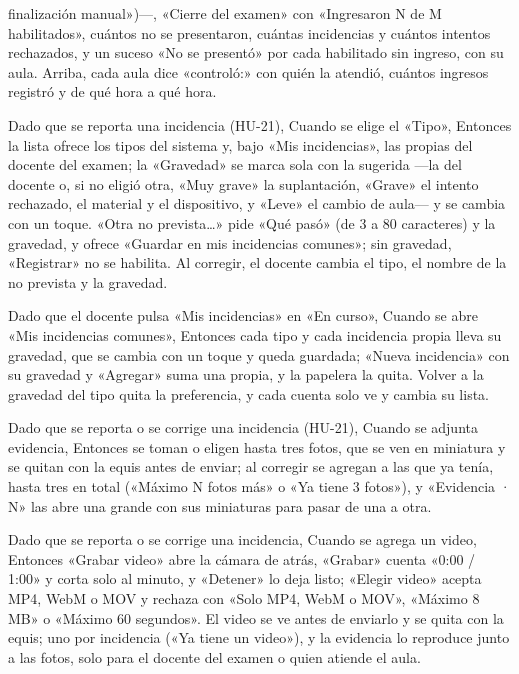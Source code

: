 {      finalización manual»)---, «Cierre del examen» con «Ingresaron N de M habilitados»,
      cuántos no se presentaron, cuántas incidencias y cuántos intentos rechazados, y un
      suceso «No se presentó» por cada habilitado sin ingreso, con su aula. Arriba, cada
      aula dice «controló:» con quién la atendió, cuántos ingresos registró y de qué
      hora a qué hora.
\item Dado que se reporta una incidencia (HU-21), Cuando se elige el «Tipo», Entonces
      la lista ofrece los tipos del sistema y, bajo «Mis incidencias», las propias del
      docente del examen; la «Gravedad» se marca sola con la sugerida ---la del docente
      o, si no eligió otra, «Muy grave» la suplantación, «Grave» el intento rechazado,
      el material y el dispositivo, y «Leve» el cambio de aula--- y se cambia con un
      toque. «Otra no prevista…» pide «Qué pasó» (de 3 a 80 caracteres) y la gravedad, y
      ofrece «Guardar en mis incidencias comunes»; sin gravedad, «Registrar» no se
      habilita. Al corregir, el docente cambia el tipo, el nombre de la no prevista y la
      gravedad.
\item Dado que el docente pulsa «Mis incidencias» en «En curso», Cuando se abre «Mis
      incidencias comunes», Entonces cada tipo y cada incidencia propia lleva su
      gravedad, que se cambia con un toque y queda guardada; «Nueva incidencia» con su
      gravedad y «Agregar» suma una propia, y la papelera la quita. Volver a la gravedad
      del tipo quita la preferencia, y cada cuenta solo ve y cambia su lista.
\item Dado que se reporta o se corrige una incidencia (HU-21), Cuando se adjunta
      evidencia, Entonces se toman o eligen hasta tres fotos, que se ven en miniatura y
      se quitan con la equis antes de enviar; al corregir se agregan a las que ya tenía,
      hasta tres en total («Máximo N fotos más» o «Ya tiene 3 fotos»), y «Evidencia ·
      N» las abre una grande con sus miniaturas para pasar de una a otra.
\item Dado que se reporta o se corrige una incidencia, Cuando se agrega un video,
      Entonces «Grabar video» abre la cámara de atrás, «Grabar» cuenta «0:00 / 1:00» y
      corta solo al minuto, y «Detener» lo deja listo; «Elegir video» acepta MP4, WebM o
      MOV y rechaza con «Solo MP4, WebM o MOV», «Máximo 8 MB» o «Máximo 60 segundos». El
      video se ve antes de enviarlo y se quita con la equis; uno por incidencia («Ya
      tiene un video»), y la evidencia lo reproduce junto a las fotos, solo para el
      docente del examen o quien atiende el aula.
}
